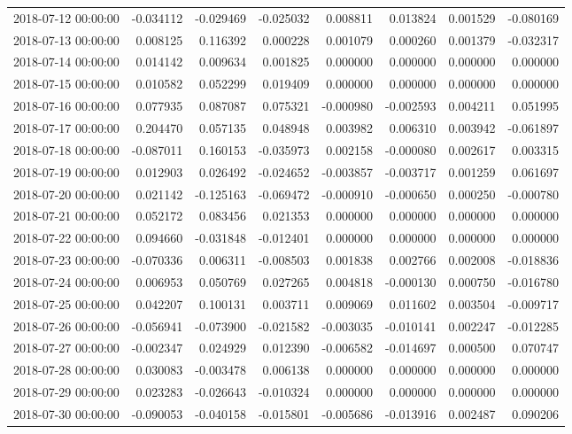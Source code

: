 \begin{tabular}{lrrrrrrr}
2018-07-12 00:00:00 & -0.034112 & -0.029469 & -0.025032 & 0.008811 & 0.013824 & 0.001529 & -0.080169 \\
2018-07-13 00:00:00 & 0.008125 & 0.116392 & 0.000228 & 0.001079 & 0.000260 & 0.001379 & -0.032317 \\
2018-07-14 00:00:00 & 0.014142 & 0.009634 & 0.001825 & 0.000000 & 0.000000 & 0.000000 & 0.000000 \\
2018-07-15 00:00:00 & 0.010582 & 0.052299 & 0.019409 & 0.000000 & 0.000000 & 0.000000 & 0.000000 \\
2018-07-16 00:00:00 & 0.077935 & 0.087087 & 0.075321 & -0.000980 & -0.002593 & 0.004211 & 0.051995 \\
2018-07-17 00:00:00 & 0.204470 & 0.057135 & 0.048948 & 0.003982 & 0.006310 & 0.003942 & -0.061897 \\
2018-07-18 00:00:00 & -0.087011 & 0.160153 & -0.035973 & 0.002158 & -0.000080 & 0.002617 & 0.003315 \\
2018-07-19 00:00:00 & 0.012903 & 0.026492 & -0.024652 & -0.003857 & -0.003717 & 0.001259 & 0.061697 \\
2018-07-20 00:00:00 & 0.021142 & -0.125163 & -0.069472 & -0.000910 & -0.000650 & 0.000250 & -0.000780 \\
2018-07-21 00:00:00 & 0.052172 & 0.083456 & 0.021353 & 0.000000 & 0.000000 & 0.000000 & 0.000000 \\
2018-07-22 00:00:00 & 0.094660 & -0.031848 & -0.012401 & 0.000000 & 0.000000 & 0.000000 & 0.000000 \\
2018-07-23 00:00:00 & -0.070336 & 0.006311 & -0.008503 & 0.001838 & 0.002766 & 0.002008 & -0.018836 \\
2018-07-24 00:00:00 & 0.006953 & 0.050769 & 0.027265 & 0.004818 & -0.000130 & 0.000750 & -0.016780 \\
2018-07-25 00:00:00 & 0.042207 & 0.100131 & 0.003711 & 0.009069 & 0.011602 & 0.003504 & -0.009717 \\
2018-07-26 00:00:00 & -0.056941 & -0.073900 & -0.021582 & -0.003035 & -0.010141 & 0.002247 & -0.012285 \\
2018-07-27 00:00:00 & -0.002347 & 0.024929 & 0.012390 & -0.006582 & -0.014697 & 0.000500 & 0.070747 \\
2018-07-28 00:00:00 & 0.030083 & -0.003478 & 0.006138 & 0.000000 & 0.000000 & 0.000000 & 0.000000 \\
2018-07-29 00:00:00 & 0.023283 & -0.026643 & -0.010324 & 0.000000 & 0.000000 & 0.000000 & 0.000000 \\
2018-07-30 00:00:00 & -0.090053 & -0.040158 & -0.015801 & -0.005686 & -0.013916 & 0.002487 & 0.090206 \\

\end{tabular}
